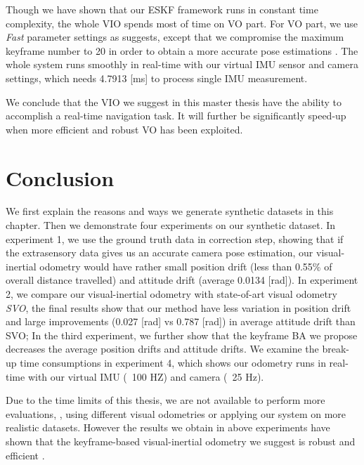 Though we have shown that our ESKF framework runs in constant time complexity, the whole VIO spends most of time on VO part. For VO part, we use \textit{Fast} parameter settings as \cite{forster2014svo} suggests, except that we compromise the maximum keyframe number to 20 in order to obtain a more accurate pose estimations . The whole system runs smoothly in real-time with our virtual IMU sensor and camera settings, which needs 4.7913 [ms] to process single IMU measurement. 

We conclude that the VIO we suggest in this master thesis have the ability to accomplish a real-time navigation task. It will further be significantly speed-up when more efficient and robust VO has been exploited.

\section{Conclusion}
\label{sec:exp_conclusion}

We first explain the reasons and ways we generate synthetic datasets in this chapter. Then we demonstrate four experiments on our synthetic dataset. In experiment 1, we use the ground truth data in correction step, showing that if the extrasensory data gives us an accurate camera pose estimation, our visual-inertial odometry would have rather small position drift (less than 0.55\% of overall distance travelled) and attitude drift (average 0.0134 [rad]). In experiment 2, we compare our visual-inertial odometry with state-of-art visual odometry \textit{SVO}, the final results show that our method have less variation in position drift and large improvements (0.027 [rad] vs 0.787 [rad]) in average attitude drift than SVO; In the third experiment, we further show that the keyframe BA we propose decreases the average position drifts and attitude drifts. We examine the break-up time consumptions in experiment 4, which shows our odometry runs in real-time with our virtual IMU (~100 HZ) and camera (~25 Hz).

Due to the time limits of this thesis, we are not available to perform more evaluations, \eg, using different visual odometries or applying our system on more realistic datasets. However the results we obtain in above experiments have shown that the keyframe-based visual-inertial odometry we suggest is robust and efficient . 